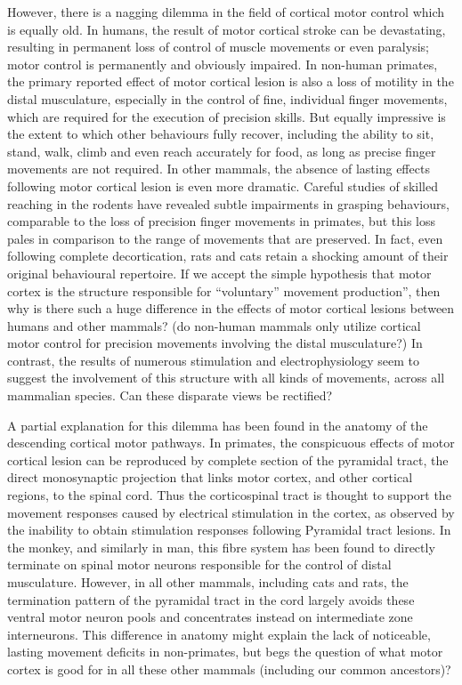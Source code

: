 However, there is a nagging dilemma in the field of cortical motor control which is equally old. In humans, the result of motor cortical stroke can be devastating, resulting in permanent loss of control of muscle movements or even paralysis; motor control is permanently and obviously impaired. In non-human primates, the primary reported effect of motor cortical lesion is also a loss of motility in the distal musculature, especially in the control of fine, individual finger movements, which are required for the execution of precision skills. But equally impressive is the extent to which other behaviours fully recover, including the ability to sit, stand, walk, climb and even reach accurately for food, as long as precise finger movements are not required. In other mammals, the absence of lasting effects following motor cortical lesion is even more dramatic. Careful studies of skilled reaching in the rodents have revealed subtle impairments in grasping behaviours, comparable to the loss of precision finger movements in primates, but this loss pales in comparison to the range of movements that are preserved. In fact, even following complete decortication, rats and cats retain a shocking amount of their original behavioural repertoire. If we accept the simple hypothesis that motor cortex is the structure responsible for “voluntary” movement production”, then why is there such a huge difference in the effects of motor cortical lesions between humans and other mammals? (do non-human mammals only utilize cortical motor control for precision movements involving the distal musculature?) In contrast, the results of numerous stimulation and electrophysiology seem to suggest the involvement of this structure with all kinds of movements, across all mammalian species. Can these disparate views be rectified?

A partial explanation for this dilemma has been found in the anatomy of the descending cortical motor pathways. In primates, the conspicuous effects of motor cortical lesion can be reproduced by complete section of the pyramidal tract, the direct monosynaptic projection that links motor cortex, and other cortical regions, to the spinal cord. Thus the corticospinal tract is thought to support the movement responses caused by electrical stimulation in the cortex, as observed by the inability to obtain stimulation responses following Pyramidal tract lesions. In the monkey, and similarly in man, this fibre system has been found to directly terminate on spinal motor neurons responsible for the control of distal musculature. However, in all other mammals, including cats and rats, the termination pattern of the pyramidal tract in the cord largely avoids these ventral motor neuron pools and concentrates instead on intermediate zone interneurons. This difference in anatomy might explain the lack of noticeable, lasting movement deficits in non-primates, but begs the question of what motor cortex is good for in all these other mammals (including our common ancestors)? 

